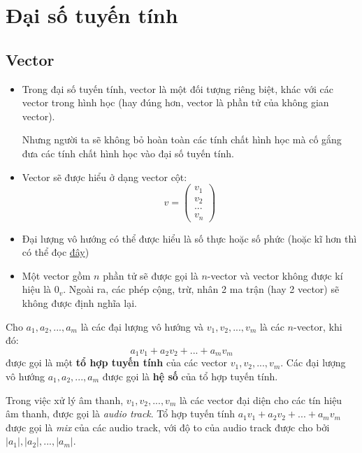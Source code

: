 \chapter{Đại số tuyến tính}

\section{Vector}

\begin{itemize}
    \item Trong đại số tuyến tính, vector là một đối tượng riêng biệt, khác với các vector trong hình học (hay đúng hơn, vector là phần tử của không gian vector).

    \begin{note}
        Nhưng người ta sẽ không bỏ hoàn toàn các tính chất hình học mà cố gắng đưa các tính chất hình học vào đại số tuyến tính.
    \end{note}

    \item Vector sẽ được hiểu ở dạng vector cột:
    $$
    v = \begin{pmatrix}
        v_1 \\
        v_2 \\
        ... \\
        v_n
    \end{pmatrix}
    $$

    \item Đại lượng vô hướng có thể được hiểu là số thực hoặc số phức (hoặc kĩ hơn thì có thể đọc \href{https://vi.wikipedia.org/wiki/Scalar_(to%C3%A1n_h%E1%BB%8Dc)}{đây})
    
    \item Một vector gồm $n$ phần tử sẽ được gọi là $n$-vector và vector không được kí hiệu là $0_{v}$. Ngoài ra, các phép cộng, trừ, nhân 2 ma trận (hay 2 vector) sẽ không được định nghĩa lại.
\end{itemize}

\begin{defivn}
    Cho $a_1, a_2, ..., a_m$ là các đại lượng vô hướng và $v_1, v_2, ..., v_m$ là các $n$-vector, khi đó:
    $$
    a_1v_1 + a_2v_2 + ... + a_mv_m
    $$
    được gọi là một \textbf{tổ hợp tuyến tính} của các vector $v_1, v_2, ..., v_m$. Các đại lượng vô hướng $a_1, a_2, ..., a_m$ được gọi là \textbf{hệ số} của tổ hợp tuyến tính.
\end{defivn}

\begin{egvn} 
    Trong việc xử lý âm thanh, $v_1, v_2, ..., v_m$ là các vector đại diện cho các tín hiệu âm thanh, được gọi là \textit{audio track}. Tổ hợp tuyến tính $a_1v_1 + a_2v_2 + ... + a_mv_m$ được gọi là \textit{mix} của các audio track, với độ to của audio track được cho bởi $|a_1|, |a_2|, ..., |a_m|$.
\end{egvn}

